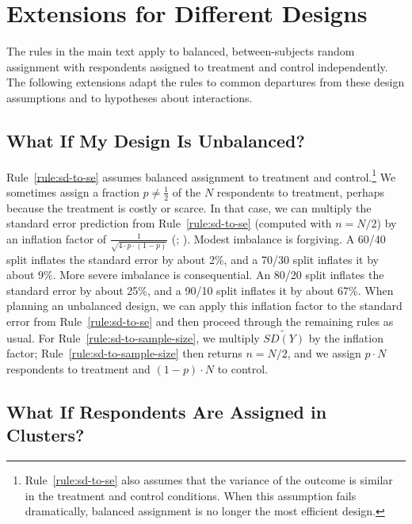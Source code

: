 \documentclass[12pt]{article}
\begin{document}
\section{Extensions for Different Designs}\label{app:designs}

The rules in the main text apply to balanced, between-subjects random assignment with respondents assigned to treatment and control independently.
The following extensions adapt the rules to common departures from these design assumptions and to hypotheses about interactions.

\subsection*{What If My Design Is Unbalanced?}

Rule~\ref{rule:sd-to-se} assumes balanced assignment to treatment and control.\footnote{
  Rule~\ref{rule:sd-to-se} also assumes that the variance of the outcome is similar in the treatment and control conditions. When this assumption fails dramatically, balanced assignment is no longer the most efficient design.
}
We sometimes assign a fraction $p \neq \frac{1}{2}$ of the $N$ respondents to treatment, perhaps because the treatment is costly or scarce.
In that case, we can multiply the standard error prediction from Rule~\ref{rule:sd-to-se} (computed with $n = N/2$) by an inflation factor of $\frac{1}{\sqrt{4 \cdot p \cdot \left( 1 - p \right)}}$ (\citealp[61]{Gerber2012}; \citealp[550--551, 553--554]{Bloom1995}).
Modest imbalance is forgiving.
A 60/40 split inflates the standard error by about 2\%, and a 70/30 split inflates it by about 9\%.
More severe imbalance is consequential.
An 80/20 split inflates the standard error by about 25\%, and a 90/10 split inflates it by about 67\%.
When planning an unbalanced design, we can apply this inflation factor to the standard error from Rule~\ref{rule:sd-to-se} and then proceed through the remaining rules as usual.
For Rule~\ref{rule:sd-to-sample-size}, we multiply $\widetilde{SD(Y)}$ by the inflation factor; Rule~\ref{rule:sd-to-sample-size} then returns $n = N/2$, and we assign $p \cdot N$ respondents to treatment and $\left( 1 - p \right) \cdot N$ to control.

\subsection*{What If Respondents Are Assigned in Clusters?}
\end{document}
